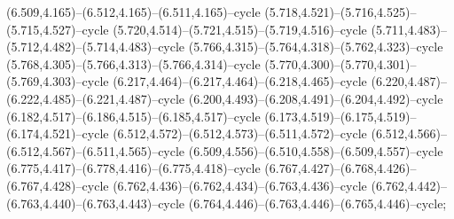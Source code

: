 (6.509,4.165)--(6.512,4.165)--(6.511,4.165)--cycle (5.718,4.521)--(5.716,4.525)--(5.715,4.527)--cycle (5.720,4.514)--(5.721,4.515)--(5.719,4.516)--cycle (5.711,4.483)--(5.712,4.482)--(5.714,4.483)--cycle (5.766,4.315)--(5.764,4.318)--(5.762,4.323)--cycle (5.768,4.305)--(5.766,4.313)--(5.766,4.314)--cycle (5.770,4.300)--(5.770,4.301)--(5.769,4.303)--cycle (6.217,4.464)--(6.217,4.464)--(6.218,4.465)--cycle (6.220,4.487)--(6.222,4.485)--(6.221,4.487)--cycle (6.200,4.493)--(6.208,4.491)--(6.204,4.492)--cycle (6.182,4.517)--(6.186,4.515)--(6.185,4.517)--cycle (6.173,4.519)--(6.175,4.519)--(6.174,4.521)--cycle (6.512,4.572)--(6.512,4.573)--(6.511,4.572)--cycle (6.512,4.566)--(6.512,4.567)--(6.511,4.565)--cycle (6.509,4.556)--(6.510,4.558)--(6.509,4.557)--cycle (6.775,4.417)--(6.778,4.416)--(6.775,4.418)--cycle (6.767,4.427)--(6.768,4.426)--(6.767,4.428)--cycle (6.762,4.436)--(6.762,4.434)--(6.763,4.436)--cycle (6.762,4.442)--(6.763,4.440)--(6.763,4.443)--cycle (6.764,4.446)--(6.763,4.446)--(6.765,4.446)--cycle;
